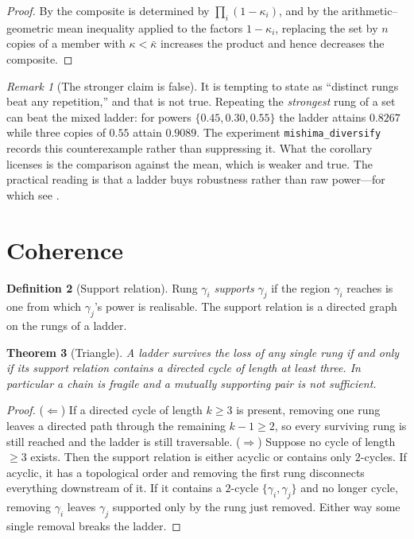 \documentclass[11pt,twocolumn,a4paper]{article}
\newtheorem{theorem}{Theorem}[section]
\theoremstyle{definition}
\newtheorem{definition}[theorem]{Definition}
\theoremstyle{remark}
\newtheorem{remark}[theorem]{Remark}
\newcommand{\pot}{\kappa}
\begin{document}
\begin{proof}
By  the composite is determined by
$\prod_i(1-\pot_i)$, and by the arithmetic--geometric mean inequality applied to
the factors $1-\pot_i$, replacing the set by $n$ copies of a member with
$\pot<\bar\pot$ increases the product and hence decreases the composite.
\end{proof}

\begin{remark}[The stronger claim is false]
\label{rem:diversify-honest}
It is tempting to state  as ``distinct rungs beat any
repetition,'' and that is not true. Repeating the \emph{strongest} rung of a set
can beat the mixed ladder: for powers $\{0.45,0.30,0.55\}$ the ladder attains
$0.8267$ while three copies of $0.55$ attain $0.9089$. The experiment
\texttt{mishima\_diversify} records this counterexample rather than suppressing
it. What the corollary licenses is the comparison against the mean, which is
weaker and true. The practical reading is that a ladder buys robustness rather
than raw power---for which see .
\end{remark}

\section{Coherence}
\label{sec:coherence}

\begin{definition}[Support relation]
\label{def:support}
Rung $\gamma_i$ \emph{supports} $\gamma_j$ if the region $\gamma_i$ reaches is
one from which $\gamma_j$'s power is realisable. The support relation is a
directed graph on the rungs of a ladder.
\end{definition}

\begin{theorem}[Triangle]
\label{thm:triangle}
A ladder survives the loss of any single rung if and only if its support relation
contains a directed cycle of length at least three. In particular a chain is
fragile and a mutually supporting pair is not sufficient.
\end{theorem}

\begin{proof}
($\Leftarrow$) If a directed cycle of length $k\ge3$ is present, removing one
rung leaves a directed path through the remaining $k-1\ge2$, so every surviving
rung is still reached and the ladder is still traversable.
($\Rightarrow$) Suppose no cycle of length $\ge3$ exists. Then the support
relation is either acyclic or contains only $2$-cycles. If acyclic, it has a
topological order and removing the first rung disconnects everything downstream
of it. If it contains a $2$-cycle $\{\gamma_i,\gamma_j\}$ and no longer cycle,
removing $\gamma_i$ leaves $\gamma_j$ supported only by the rung just removed.
Either way some single removal breaks the ladder.
\end{proof}
\end{document}
